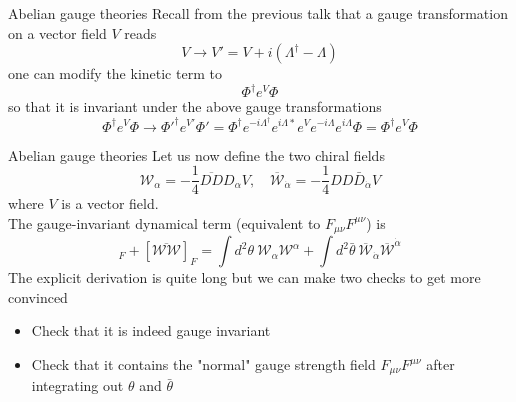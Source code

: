 \documentclass[10pt]{beamer}
\begin{document}
\begin{frame}{Abelian gauge theories}
Recall from the previous talk that a gauge transformation on a vector field $V$ reads
\begin{equation*}
    V \to V' = V + i(\Lambda^{\dagger} - \Lambda)
\end{equation*}
one can modify the kinetic term to
\begin{equation*}
    \Phi^{\dagger} e^V \Phi
\end{equation*}
so that it is invariant under the above gauge transformations
\begin{equation*}
    \Phi^{\dagger}e^V\Phi \to \Phi '^{\dagger}  e^{V'} \Phi ' = \Phi^{\dagger}e^{-i\Lambda^{\dagger}}e^{i\Lambda*}e^Ve^{-i\Lambda}e^{i\Lambda}\Phi = \Phi^{\dagger}e^V\Phi
\end{equation*}

\end{frame}


\begin{frame}{Abelian gauge theories}
Let us now define the two chiral fields \\
\begin{equation*}
    \mathcal{W}_{\alpha}=-\frac{1}{4} \overline{D D} D_{\alpha} V, \quad \overline{\mathcal{W}}_{\dot{\alpha}} = -\frac{1}{4} D D \bar{D}_{\dot{\alpha}} V
\end{equation*}
where $V$ is a vector field. \\
The gauge-invariant dynamical term (equivalent to $F_{\mu\nu} F^{\mu\nu}$) is 
\begin{equation*}
   [\mathcal{W}\mathcal{W}]_F + [\overline{\mathcal{W}\mathcal{W}}]_F = \int d^2\theta \ \mathcal{W}_{\alpha} \mathcal{W}^{\alpha} + \int d^2\bar\theta \ \overline{\mathcal{W}}_{\dot\alpha} \overline{\mathcal{W}}^{\dot\alpha}
\end{equation*}
The explicit derivation is quite long but we can make two checks to get more convinced
\begin{itemize}
    \item Check that it is indeed gauge invariant
    \item Check that it contains the "normal" gauge strength field $F_{\mu\nu}F^{\mu\nu}$ after integrating out $\theta$ and $\bar\theta$
\end{itemize}
\end{frame}
\end{document}
